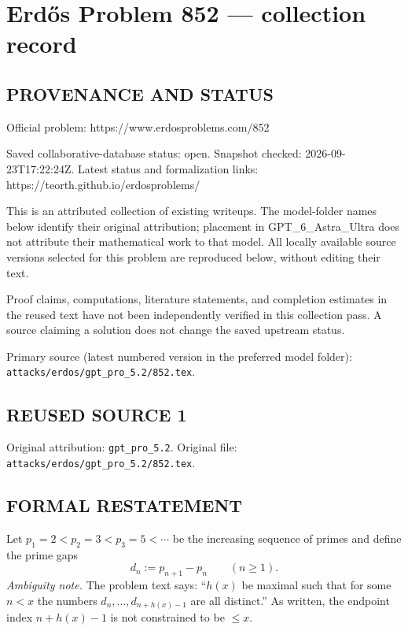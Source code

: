 \section*{Erd\H{o}s Problem 852 --- collection record}

\subsection*{PROVENANCE AND STATUS}
Official problem: https://www.erdosproblems.com/852

Saved collaborative-database status: open.
Snapshot checked: 2026-09-23T17:22:24Z.
Latest status and formalization links: https://teorth.github.io/erdosproblems/

This is an attributed collection of existing writeups. The model-folder names below identify their original attribution; placement in GPT\_6\_Astra\_Ultra does not attribute their mathematical work to that model. All locally available source versions selected for this problem are reproduced below, without editing their text.

Proof claims, computations, literature statements, and completion estimates in the reused text have not been independently verified in this collection pass. A source claiming a solution does not change the saved upstream status.

Primary source (latest numbered version in the preferred model folder): \texttt{attacks/erdos/gpt\_pro\_5.2/852.tex}.

\subsection*{REUSED SOURCE 1}
Original attribution: \texttt{gpt\_pro\_5.2}.
Original file: \texttt{attacks/erdos/gpt\_pro\_5.2/852.tex}.



\subsection*{FORMAL RESTATEMENT}
Let $p_1=2<p_2=3<p_3=5<\cdots$ be the increasing sequence of primes and define the prime gaps
\[
  d_n := p_{n+1}-p_n \qquad (n\ge 1).
\]
\emph{Ambiguity note.} The problem text says: ``$h(x)$ be maximal such that for some $n<x$ the numbers $d_n,\ldots,d_{n+h(x)-1}$ are all distinct.''  As written, the endpoint index $n+h(x)-1$ is not constrained to be $\le x$.

